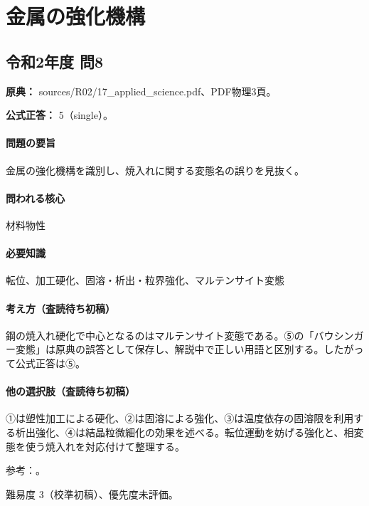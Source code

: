 \section{金属の強化機構}

\subsection{令和2年度 問8}
\label{q:r02-reg-applied-08}

\noindent\textbf{原典：} sources/R02/17\_applied\_science.pdf、PDF物理3頁。

\textbf{公式正答：} 5（single）。

\paragraph{問題の要旨} 金属の強化機構を識別し、焼入れに関する変態名の誤りを見抜く。

\paragraph{問われる核心} 材料物性

\paragraph{必要知識} 転位、加工硬化、固溶・析出・粒界強化、マルテンサイト変態

\paragraph{考え方（査読待ち初稿）} 鋼の焼入れ硬化で中心となるのはマルテンサイト変態である。⑤の「バウシンガー変態」は原典の誤答として保存し、解説中で正しい用語と区別する。したがって公式正答は⑤。

\paragraph{他の選択肢（査読待ち初稿）} ①は塑性加工による硬化、②は固溶による強化、③は温度依存の固溶限を利用する析出強化、④は結晶粒微細化の効果を述べる。転位運動を妨げる強化と、相変態を使う焼入れを対応付けて整理する。

\par 参考：\cite{martensite_cambridge}。

\par 難易度 3（校準初稿）、優先度未評価。
